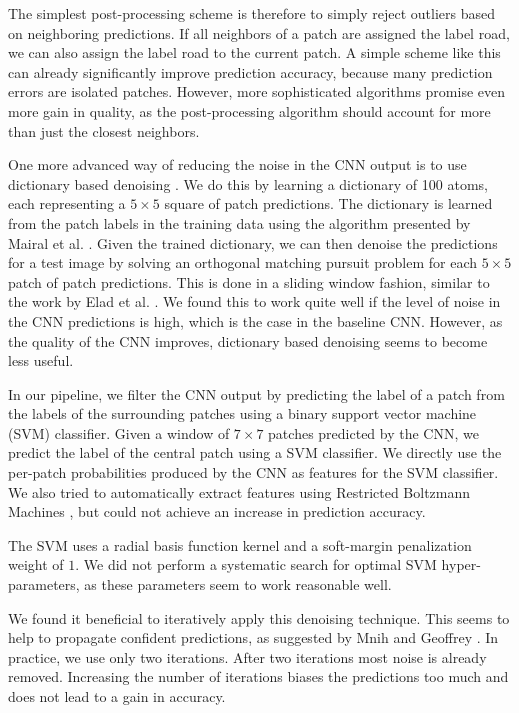 \documentclass[10pt,conference,compsocconf]{IEEEtran}
\begin{document}
\par 
The simplest post-processing scheme is therefore to simply reject outliers based on neighboring predictions. If all neighbors of a patch are assigned the label road, we can also assign the label road to the current patch. A simple scheme like this can already significantly improve prediction accuracy, because many prediction errors are isolated patches. However, more sophisticated algorithms promise even more gain in quality, as the post-processing algorithm should account for more than just the closest neighbors.

\par 
One more advanced way of reducing the noise in the CNN output is to use dictionary based denoising \cite{Elad.2006}. We do this by learning a dictionary of 100 atoms, each representing a  $ 5 \times 5 $ square of patch predictions. The dictionary is learned from the patch labels in the training data using the algorithm presented by Mairal et al. \cite{Mairal.2009}. Given the trained dictionary, we can then denoise the predictions for a test image by solving an orthogonal matching pursuit problem for each $ 5 \times 5 $ patch of patch predictions. This is done in a sliding window fashion, similar to the work by Elad et al. \cite{Elad.2006}. We found this to work quite well if the level of noise in the CNN predictions is high, which is the case in the baseline CNN. However, as the quality of the CNN improves, dictionary based denoising seems to become less useful.

\par 
In our pipeline, we filter the CNN output by predicting the label of a patch from the labels of the surrounding patches using a binary support vector machine (SVM) classifier. Given a window of $ 7 \times 7 $ patches predicted by the CNN, we predict the label of the central patch using a SVM classifier. We directly use the per-patch probabilities produced by the CNN as features for the SVM classifier. We also tried to automatically extract features using Restricted Boltzmann Machines \cite{smolensky.1986}, but could not achieve an increase in prediction accuracy.
\par
The SVM uses a radial basis function kernel and a soft-margin penalization weight of $ 1 $. We did not perform a systematic search for optimal SVM hyper-parameters, as these parameters seem to work reasonable well.
\par 
We found it beneficial to iteratively apply this denoising technique. This seems to help to propagate confident predictions, as suggested by Mnih and Geoffrey \cite{Mnih.2010}. In practice, we use only two iterations. After two iterations most noise is already removed. Increasing the number of iterations biases the predictions too much and does not lead to a gain in accuracy.
\end{document}
